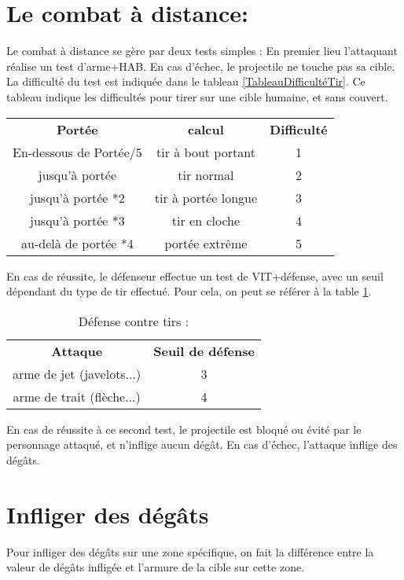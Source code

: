 \documentclass[10pt,a4paper,twocolumn]{book}
\begin{document}
\section{Le combat à distance:}
Le combat à distance se gère par deux tests simples :
En premier lieu l’attaquant réalise un test d’arme+HAB. En cas d’échec, le projectile ne touche pas sa cible. La difficulté du test est indiquée dans le tableau \ref{TableauDifficultéTir}. Ce tableau indique les difficultés pour tirer sur une cible humaine, et sans couvert.
\begin{table*}
\caption{Difficultés de tir}
\label{TableauDifficultéTir}
\begin{center}
\begin{tabular}{ccc}
\textbf{Portée} & \textbf{calcul}& \textbf{Difficulté} \\
   En-dessous de Portée/5 & tir à bout portant & 1  \\
   jusqu'à portée & tir normal & 2 \\
jusqu'à portée *2 & tir à portée longue & 3 \\
jusqu'à portée *3 & tir en cloche & 4 \\
au-delà de portée *4 & portée extrême & 5
\end{tabular}
\end{center}
\end{table*}

En cas de réussite, le défenseur effectue un test de VIT+défense, avec un seuil dépendant du type de tir effectué. Pour cela, on peut se référer à la table \ref{tableDiffContreTirs}.

\begin{table}
\caption{ Défense contre tirs :}
\label{tableDiffContreTirs}
\begin{center}
\begin{tabular}{cc}
\textbf{Attaque} & \textbf{Seuil de défense} \\
   arme de jet (javelots...) & 3\\
   arme de trait (flèche...) & 4\\
\end{tabular}
\end{center}
\end{table}
En cas de réussite à ce second test, le projectile est bloqué ou évité par le personnage attaqué, et n’inflige aucun dégât. 
En cas d’échec, l’attaque inflige des dégâts.
\section{Infliger des dégâts}
Pour infliger des dégâts sur une zone spécifique, on fait la différence entre la valeur de dégâts infligée et l'armure de la cible sur cette zone.
\end{document}

